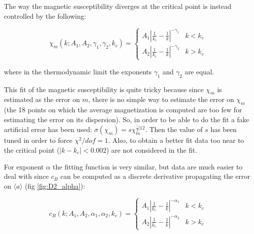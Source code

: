 \documentclass[a4paper, 11pt]{article}
\begin{document}
      The way the magnetic susceptibility diverges at the critical point is instead controlled by the following:

      \begin{equation}
        \chi_m(k;A_1,A_2,\gamma_1,\gamma_2,k_c) = \begin{cases}
          A_1 \left|\frac{1}{k_c} - \frac{1}{k} \right|^{-\gamma_1} & k < k_c \\
          A_2 \left|\frac{1}{k_c} - \frac{1}{k} \right|^{-\gamma_2} & k > k_c
        \end{cases}
      \end{equation}

      where in the thermodynamic limit the exponents $\gamma_1$ and $\gamma_2$ are equal.

      This fit of the magnetic susceptibility is quite tricky because since $\chi_m$ is estimated as the error on $m$, there is no simple way to estimate the error on $\chi_m$ (the 18 points on which the average magnetization is computed are too few for estimating the error on its dispersion). So, in order to be able to do the fit a fake artificial error has been used: $\sigma(\chi_m) = s\chi_m^{\frac[f]{1}{2}}$. Then the value of $s$ has been tuned in order to force $\chi^2/dof = 1$. Also, to obtain a better fit data too near to the critical point ($|k - k_c| < 0.002$) are not considered in the fit.

      For exponent $\alpha$ the fitting function is very similar, but data are much easier to deal with since $c_B$ can be computed as a discrete derivative propagating the error on $\langle a \rangle$ (fig \ref{fig:D2_alpha}):

      \begin{equation}
        c_B(k;A_1,A_2,\alpha_1,\alpha_2,k_c) = \begin{cases}
          A_1 \left|\frac{1}{k_c} - \frac{1}{k} \right|^{-\alpha_1} & k < k_c \\
          A_2 \left|\frac{1}{k_c} - \frac{1}{k} \right|^{-\alpha_2} & k > k_c
        \end{cases}
      \end{equation}
\end{document}
